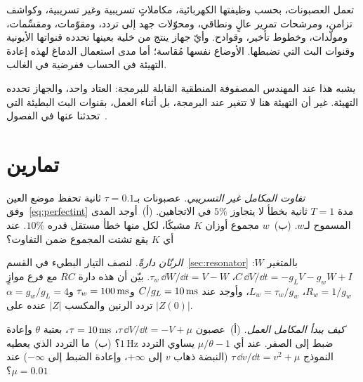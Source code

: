 \begin{keyblock}
\begin{proposition}
\label{prop:eetypes}
تعمل العصبونات، بحسب وظيفتها الكهربائية، مكاملاتٍ تسريبية وغير تسريبية، وكواشف تزامن، ومرشحات تمرير عالٍ ونطاقي، ومحوّلات جهد إلى تردد، ومقوّمات، ومقسِّمات، ومولّدات، وخطوط تأخير، وقوادح. وأيّ جهاز ينتج من خلية بعينها تحدده قنواتها الأيونية وقنوات البث التي تضبطها. الأوضاع نفسها مُقاسة؛ أما مدى استعمال الدماغ لهذه إعادة التهيئة في الحساب ففرضية في الغالب.
\end{proposition}
\end{keyblock}

يشبه هذا عند المهندس المصفوفة المنطقية القابلة للبرمجة: العتاد واحد، والجهاز تحدده التهيئة. غير أن التهيئة هنا لا تتغير عند البرمجة، بل أثناء العمل، بقنوات البث البطيئة التي تحدثنا عنها في الفصول~\babelsublr{\ref{sec:serocomputer}--\ref{sec:acet}}.

\section{تمارين}

\begin{exercise}[\lvlA]
\label{ex:18:1}
\emph{تفاوت المكامل غير التسريبي.} عصبونات بـ$\tau=0.1$ ثانية تحفظ موضع العين وفق~\eqref{eq:perfectint} مدة $T=1$ ثانية بخطأ لا يتجاوز $5\%$ في الاتجاهين. (أ)~أوجد المدى المسموح لـ$w$. (ب)~$w$ مجموع أوزان $K$ مشبكًا، لكل منها خطأ مستقل قدره $10\%$. عند أي $K$ يقع تشتت المجموع ضمن التفاوت؟
\end{exercise}

\begin{exercise}[\lvlB]
\label{ex:18:2}
\emph{الرنّان دارةً.} لنصف التيار البطيء في القسم~\ref{sec:resonator} بالمتغير $W$: $C\,\dd V/\dd t=-g_LV-g_wW+I$، $\tau_w\,\dd W/\dd t=V-W$. بيّن أن هذه دارة $RC$ مع فرع موازٍ $R_w=1/g_w$، $L_w=\tau_w/g_w$، وأوجد عند $C/g_L=10\,\text{ms}$ و$\tau_w=100\,\text{ms}$ و$\alpha=g_w/g_L=4$ تردد الرنين والمكسب $|Z|$ عنده على $|Z(0)|$.
\end{exercise}

\begin{exercise}[\lvlB]
\label{ex:18:3}
\emph{كيف يبدأ المكامل العمل.} (أ)~عصبون $\tau\,\dd V/\dd t=-V+\mu$، $\tau=10\,\text{ms}$، بعتبة $\theta$ وإعادة ضبط إلى الصفر. عند أي $\mu/\theta-1$ يساوي التردد $1\,\text{Hz}$؟ (ب)~ما التردد الذي يعطيه النموذج $\tau\,\dd v/\dd t=v^2+\mu$ (النبضة ذهاب $v$ إلى $+\infty$، وإعادة الضبط إلى $-\infty$) عند $\mu=0.01$؟
\end{exercise}


